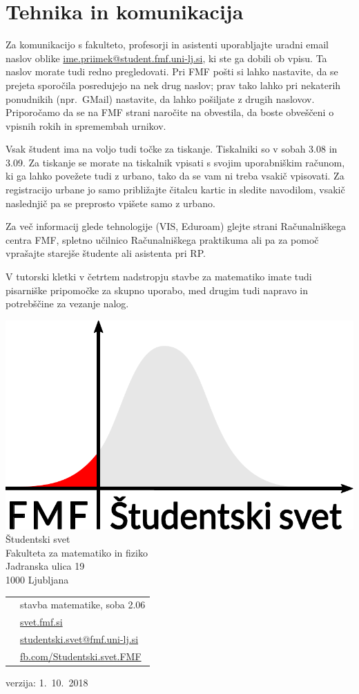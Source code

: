 \documentclass[a4paper,notumble]{leaflet} %
\begin{document}
  \section{Tehnika in komunikacija}
  Za komunikacijo s fakulteto, profesorji in asistenti uporabljajte uradni email naslov oblike
  \url{ime.priimek@student.fmf.uni-lj.si}, ki ste ga dobili ob vpisu. Ta naslov morate tudi redno pregledovati. Pri FMF pošti si lahko nastavite, da se prejeta sporočila posredujejo na nek drug naslov;
  prav tako lahko pri nekaterih ponudnikih (npr.\ GMail) nastavite, da lahko pošiljate z drugih naslovov.
  Priporočamo da se na FMF strani naročite na obvestila, da boste obveščeni o vpisnih rokih in spremembah urnikov.

  Vsak študent ima na voljo tudi točke za tiskanje. Tiskalniki so v sobah 3.08 in 3.09. Za tiskanje se morate na tiskalnik vpisati s svojim uporabniškim računom, ki ga lahko povežete tudi z urbano, tako da se vam ni treba vsakič vpisovati.  Za registracijo urbane jo samo približajte čitalcu kartic in sledite navodilom, vsakič naslednjič pa se preprosto vpišete samo z urbano.

  Za več informacij glede tehnologije (VIS, Eduroam) glejte strani Računalniškega centra FMF, spletno učilnico Računalniškega praktikuma ali pa za pomoč vprašajte starejše študente ali asistenta pri RP.

  V tutorski kletki v četrtem nadstropju stavbe za matematiko imate tudi pisarniške pripomočke za skupno uporabo, med drugim tudi napravo in potrebščine za vezanje nalog.

  \newpage
  \newpage
    {\Large

    \includegraphics[width=0.6\linewidth]{ssfmf_logo_col.pdf} \\[1cm]

    Študentski svet \\
    Fakulteta za matematiko in fiziko \\
    Jadranska ulica 19 \\
    1000 Ljubljana \\[1cm]

    \begin{tabular}{cl}
    \faBuilding{} & stavba matematike, soba 2.06 \\[0.3cm]
    \faGlobe{} & \url{svet.fmf.si} \\[0.3cm]
    \faEnvelopeSquare{} & \url{studentski.svet@fmf.uni-lj.si} \\[0.3cm]
    \faFacebookSquare{} & \url{fb.com/Studentski.svet.FMF}
    \end{tabular}

    }

    \vfill
    verzija: 1.~10.~2018
\end{document}
